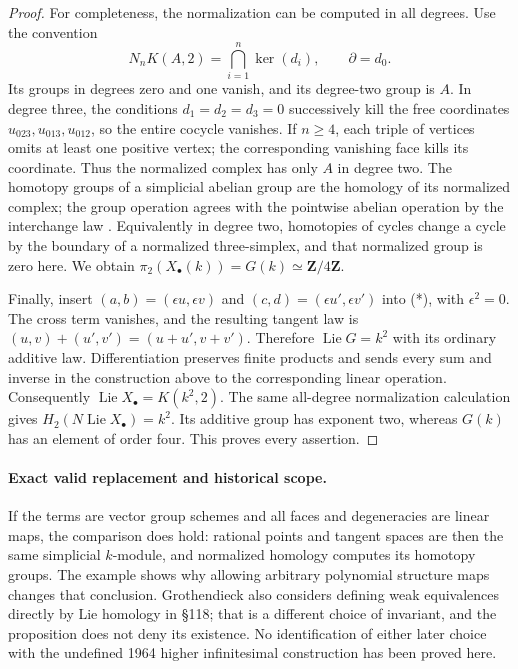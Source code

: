 \begin{proof}
For completeness, the normalization can be computed in all degrees.
Use the convention
\[
 N_nK(A,2)=\bigcap_{i=1}^n\ker(d_i),\qquad\partial=d_0.
\]
Its groups in degrees zero and one vanish, and its degree-two group is
\(A\).  In degree three, the conditions \(d_1=d_2=d_3=0\) successively
kill the free coordinates \(u_{023},u_{013},u_{012}\), so the entire
cocycle vanishes.  If \(n\geq4\), each triple of vertices omits at least
one positive vertex; the corresponding vanishing face kills its
coordinate.  Thus the normalized complex has only \(A\) in degree two.
The homotopy groups of a simplicial abelian group are the homology of its
normalized complex; the group operation agrees with the pointwise
abelian operation by the interchange law
\cite[Chapter~III, Corollary~2.7, pp.~152--153]{A567_GoerssJardine1999}.
Equivalently in degree two, homotopies of cycles change a cycle by the
boundary of a normalized three-simplex, and that normalized group is zero
here.  We obtain
\(\pi_2(X_\bullet(k))=G(k)\simeq\mathbf Z/4\mathbf Z\).

Finally, insert \((a,b)=(\epsilon u,\epsilon v)\) and
\((c,d)=(\epsilon u',\epsilon v')\) into (*), with
\(\epsilon^2=0\).  The cross term vanishes, and the resulting tangent law
is \((u,v)+(u',v')=(u+u',v+v')\).  Therefore
\(\operatorname{Lie}G=k^2\) with its ordinary additive law.
Differentiation preserves finite products and sends every sum and inverse
in the construction above to the corresponding linear operation.
Consequently \(\operatorname{Lie}X_\bullet=K(k^2,2)\).
The same all-degree normalization calculation gives
\(H_2(N\operatorname{Lie}X_\bullet)=k^2\).
Its additive group has exponent two, whereas \(G(k)\) has an element of
order four.  This proves every assertion.
\end{proof}

\paragraph{Exact valid replacement and historical scope.}
If the terms are vector group schemes and all faces and degeneracies are
linear maps, the comparison does hold: rational points and tangent spaces
are then the same simplicial \(k\)-module, and normalized homology computes
its homotopy groups.  The example shows why allowing arbitrary polynomial
structure maps changes that conclusion.  Grothendieck also considers
defining weak equivalences directly by Lie homology in \S118; that is a
different choice of invariant, and the proposition does not deny its
existence.  No identification of either later choice with the undefined
1964 higher infinitesimal construction has been proved here.

